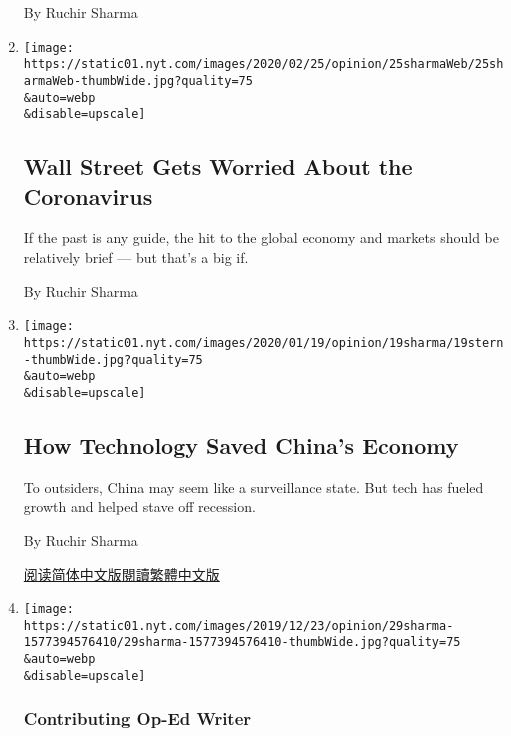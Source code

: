 \begin{enumerate}
  By Ruchir Sharma
\item
  \href{/2020/02/25/opinion/stock-market-coronavirus-economy.html}{}

  \texttt{[image: https://static01.nyt.com/images/2020/02/25/opinion/25sharmaWeb/25sharmaWeb-thumbWide.jpg?quality=75\\\&auto=webp\\\&disable=upscale]}

  \hypertarget{wall-street-gets-worried-about-the-coronavirus}{%
  \subsection{Wall Street Gets Worried About the
  Coronavirus}\label{wall-street-gets-worried-about-the-coronavirus}}

  If the past is any guide, the hit to the global economy and markets
  should be relatively brief --- but that's a big if.

  By Ruchir Sharma
\item
  \href{/2020/01/20/opinion/china-technology-economy.html}{}

  \texttt{[image: https://static01.nyt.com/images/2020/01/19/opinion/19sharma/19stern-thumbWide.jpg?quality=75\\\&auto=webp\\\&disable=upscale]}

  \hypertarget{how-technology-saved-chinas-economy}{%
  \subsection{How Technology Saved China's
  Economy}\label{how-technology-saved-chinas-economy}}

  To outsiders, China may seem like a surveillance state. But tech has
  fueled growth and helped stave off recession.

  By Ruchir Sharma

  \href{https://cn.nytimes.com/opinion/20200122/china-technology-economy/}{阅读简体中文版}\href{https://cn.nytimes.com/opinion/20200122/china-technology-economy/zh-hant/}{閱讀繁體中文版}
\item
  \href{/interactive/2019/12/27/opinion/sunday/economy-growth-forecasting.html}{}

  \texttt{[image: https://static01.nyt.com/images/2019/12/23/opinion/29sharma-1577394576410/29sharma-1577394576410-thumbWide.jpg?quality=75\\\&auto=webp\\\&disable=upscale]}

  \hypertarget{contributing-op-ed-writer}{%
  \subsubsection{Contributing Op-Ed
  Writer}\label{contributing-op-ed-writer}}


\end{enumerate}
